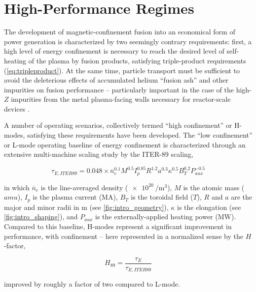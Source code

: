 \chapter{High-Performance Regimes}\label{ch:HighPerformance}

The development of magnetic-confinement fusion into an economical form of power generation is characterized by two seemingly contrary requirements: first, a high level of energy confinement is necessary to reach the desired level of self-heating of the plasma by fusion products, satisfying triple-product requirements (\cref{eq:tripleproduct}).  At the same time, particle transport must be sufficient to avoid the deleterious effects of accumulated helium ``fusion ash'' and other impurities on fusion performance -- particularly important in the case of the high-$Z$ impurities from the metal plasma-facing walls necessary for reactor-scale devices \cite{Loarte2007}.

A number of operating scenarios, collectively termed ``high confinement'' or H-modes\cite{Wagner1982}, satisfying these requirements have been developed.  The ``low confinement'' or L-mode operating baseline of energy confinement is characterized through an extensive multi-machine scaling study \cite{Yushmanov1990} by the ITER-89 scaling,

\begin{equation}\label{eq:tau89}
 \tau_{E,ITER89} = 0.048 \times \overline{n}_e^{0.1} M^{0.5} I_p^{0.85} R^{1.2} a^{0.3} \kappa^{0.5} B_T^{0.2} P_{aux}^{-0.5}
\end{equation}

\noindent in which $\overline{n}_e$ is the line-averaged density ($\SI{e20}{\per\meter\cubed}$), $M$ is the atomic mass ($\si{amu}$), $I_p$ is the plasma current ($\si{\mega\ampere}$), $B_T$ is the toroidal field ($\si{T}$), $R$ and $a$ are the major and minor radii in $\si{\meter}$ (see \cref{fig:intro_geometry}), $\kappa$ is the elongation (see \cref{fig:intro_shaping}), and $P_{aux}$ is the externally-applied heating power ($\si{\mega\watt}$).  Compared to this baseline, H-modes represent a significant improvement in performance, with confinement -- here represented in a normalized sense by the $H$-factor, \ie

\begin{equation}\label{eq:H89}
 H_{89} = \frac{\tau_E}{\tau_{E,ITER89}}
\end{equation}

\noindent improved by roughly a factor of two compared to L-mode.

